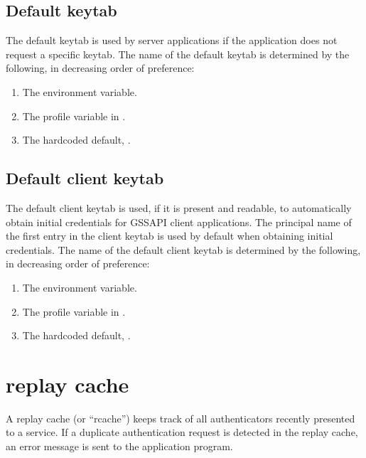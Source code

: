 \documentclass[letterpaper,10pt,english]{sphinxmanual}
\begin{document}
\section{Default keytab}
\label{\detokenize{basic/keytab_def:default-keytab}}
The default keytab is used by server applications if the application
does not request a specific keytab.  The name of the default keytab is
determined by the following, in decreasing order of preference:
\begin{enumerate}
\item {} 
The  environment variable.

\item {} 
The  profile variable in .

\item {} 
The hardcoded default, .

\end{enumerate}


\section{Default client keytab}
\label{\detokenize{basic/keytab_def:default-client-keytab}}
The default client keytab is used, if it is present and readable, to
automatically obtain initial credentials for GSSAPI client
applications.  The principal name of the first entry in the client
keytab is used by default when obtaining initial credentials.  The
name of the default client keytab is determined by the following, in
decreasing order of preference:
\begin{enumerate}
\item {} 
The  environment variable.

\item {} 
The  profile variable in
.

\item {} 
The hardcoded default, .

\end{enumerate}


\chapter{replay cache}
\label{\detokenize{basic/rcache_def:replay-cache}}\label{\detokenize{basic/rcache_def:rcache-definition}}\label{\detokenize{basic/rcache_def::doc}}
A replay cache (or “rcache”) keeps track of all authenticators
recently presented to a service.  If a duplicate authentication
request is detected in the replay cache, an error message is sent to
the application program.
\end{document}
